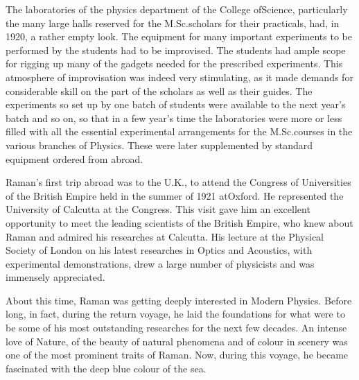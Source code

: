 The laboratories of the physics department of the College
of\break Science, particularly the many large halls reserved for the
M.Sc.\@ scholars for their practicals, had, in 1920, a rather empty
look. The equipment for many important experiments to be
performed by the students had to be improvised. The students
had ample scope for rigging up many of the gadgets needed for
the prescribed experiments. This atmosphere of improvisation
was indeed very stimulating, as it made demands for considerable
skill on the part of the scholars as well as their guides. The
experiments so set up by one batch of students were available
to the next year's batch and so on, so that in a few year's time
the laboratories were more or less filled with all the essential
experimental arrangements for the M.Sc.\@ courses in the various
branches of Physics. These were later supplemented by standard
equipment ordered from abroad.

\medskip
{}
\smallskip



\noindent
Raman's first trip abroad was to the U.K., to attend the
Congress of Universities of the British Empire held in the summer
of 1921 at\break Oxford. He represented the University of Calcutta at
the Congress. This visit gave him an excellent opportunity to meet
the leading scientists of the British Empire, who knew about  
Raman and admired his researches at Calcutta. His lecture at the
Physical Society of London on his latest researches in Optics and
Acoustics, with experimental demonstrations, drew a large
number of physicists and was immensely appreciated.

About this time, Raman was getting deeply interested in
Modern Physics. Before long, in fact, during the return voyage,
he laid the foundations for what were to be some of his most
outstanding researches for the next few decades. An intense love
of Nature, of the beauty of natural phenomena and of colour
in scenery was one of the most prominent traits of Raman. Now,
during this voyage, he became fascinated with the deep blue colour
of the sea.

